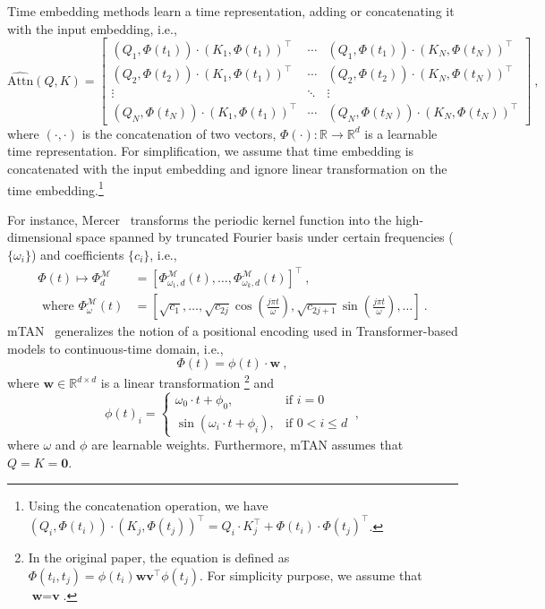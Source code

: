 Time embedding methods learn a time representation, adding or concatenating it with the input embedding, i.e.,
\begin{equation}
\operatorname{\widehat{Attn}}(Q, K)=\left[\begin{array}{cccc}
(Q_1, \Phi(t_1)) \cdot (K_1, \Phi(t_1))^\top & \cdots & (Q_1, \Phi(t_1)) \cdot (K_N, \Phi(t_N))^\top  \\ 
(Q_2, \Phi(t_2)) \cdot (K_1, \Phi(t_1))^\top  & \cdots & (Q_2, \Phi(t_2)) \cdot (K_N, \Phi(t_N))^\top \\ 
\vdots & \ddots & \vdots \\
(Q_N, \Phi(t_N)) \cdot (K_1, \Phi(t_1))^\top & \cdots & (Q_N, \Phi(t_N)) \cdot (K_N, \Phi(t_N))^\top
\end{array}\right] ~,
\end{equation}
where $(\cdot, \cdot)$ is the concatenation of two vectors, $\Phi(\cdot): \mathbb{R} \rightarrow \mathbb{R}^{d}$ is a learnable time representation. For simplification, we assume that time embedding is concatenated with the input embedding and ignore linear transformation on the time embedding.\footnote{Using the concatenation operation, we have $(Q_i, \Phi(t_i)) \cdot (K_j, \Phi(t_j))^\top=Q_i \cdot K_j^\top + \Phi(t_i) \cdot \Phi(t_j)^\top$.} 

For instance, Mercer~\cite{xu2019self} transforms the periodic kernel function into the high-dimensional space spanned by truncated Fourier basis under certain frequencies ($\{\omega_i\}$) and coefficients $\{c_i\}$, i.e.,
\begin{equation}
\begin{aligned}
\Phi(t) \mapsto \Phi_d^{\mathcal{M}} & =\left[\Phi_{\omega_1, d}^{\mathcal{M}}(t), \ldots, \Phi_{\omega_k, d}^{\mathcal{M}}(t)\right]^{\top} ~,\\
\text{ where } \Phi_\omega^{\mathcal{M}}(t) & =\left[\sqrt{c_1}, \ldots, \sqrt{c_{2 j}} \cos \left(\frac{j \pi t}{\omega}\right), \sqrt{c_{2 j+1}} \sin \left(\frac{j \pi t}{\omega}\right), \ldots\right] ~.
\end{aligned}
\end{equation}
mTAN~\cite{shukla2021multi} generalizes the notion of a positional encoding used in Transformer-based models to continuous-time domain, i.e., 
\begin{equation}
\Phi(t) = \phi(t) \cdot \textbf{w} ~,
\end{equation}
where $\textbf{w} \in \mathbb{R}^{d \times d}$ is a linear transformation \footnote{In the original paper, the equation is defined as $\Phi(t_i, t_j) = \phi(t_i) \textbf{w}\textbf{v}^\top \phi(t_j)$. For simplicity purpose, we assume that $\textbf{w} = \textbf{v}$.} and 
\begin{equation}
\phi(t)_i = \begin{cases}
    \omega_0 \cdot t + \phi_0, & \text{if } i = 0\\
    \sin (\omega_i \cdot t + \phi_i), & \text{if } 0 < i \leq d
    \end{cases} ~,
\end{equation}
where $\omega$ and $\phi$ are learnable weights. Furthermore, mTAN assumes that $Q=K=\textbf{0}$.


